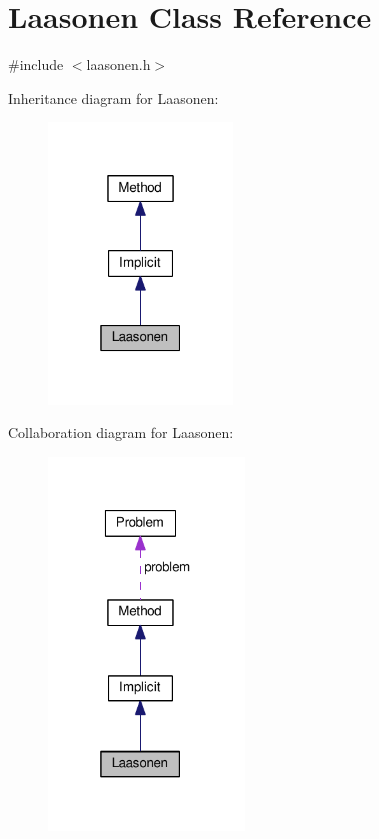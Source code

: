 \hypertarget{classLaasonen}{}\section{Laasonen Class Reference}
\label{classLaasonen}


{\ttfamily \#include $<$laasonen.\+h$>$}



Inheritance diagram for Laasonen\+:
\nopagebreak
\begin{figure}[H]
\begin{center}
\leavevmode
\includegraphics[width=139pt]{classLaasonen__inherit__graph}
\end{center}
\end{figure}


Collaboration diagram for Laasonen\+:
\nopagebreak
\begin{figure}[H]
\begin{center}
\leavevmode
\includegraphics[width=148pt]{classLaasonen__coll__graph}
\end{center}
\end{figure}
